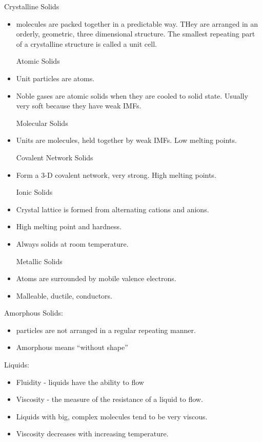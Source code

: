 \documentclass[../hchem.tex]{subfiles}
\begin{document}
Crystalline Solids
\begin{itemize}
    \item molecules are packed together in a predictable way. THey are arranged in an orderly, geometric, three dimensional 
    structure. The smallest repeating part of a crystalline structure is called a unit cell.

    Atomic Solids 
    \item Unit particles are atoms.
    \item Noble gases are atomic solids when they are cooled to solid state. Usually very soft because they have weak IMFs.
    
    Molecular Solids 
    \item Units are molecules, held together by weak IMFs. Low melting points.
    
    Covalent Network Solids 
    \item Form a 3-D covalent network, very strong. High melting points.
    
    Ionic Solids 
    \item Crystal lattice is formed from alternating cations and anions.
    \item High melting point and hardness.
    \item Always solids at room temperature.
    
    Metallic Solids 
    \item Atoms are surrounded by mobile valence electrons.
    \item Malleable, ductile, conductors.
\end{itemize}

Amorphous Solids:
\begin{itemize}
    \item particles are not arranged in a regular repeating manner.
    \item Amorphous means ``without shape''
\end{itemize}

Liquids:
\begin{itemize}
    \item Fluidity - liquids have the ability to flow 
    \item Viscosity - the measure of the resistance of a liquid to flow.
    \item Liquids with big, complex molecules tend to be very viscous.
    \item Viscosity decreases with increasing temperature.
\end{itemize}
\end{document}

